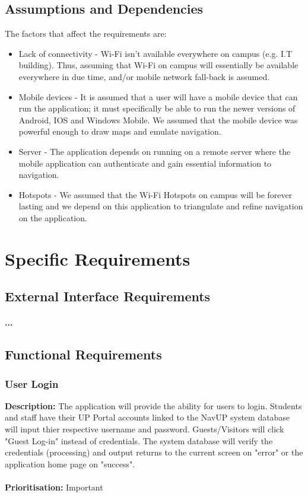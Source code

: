 \documentclass[runningheads,a4paper]{article}
\begin{document}
\subsection{Assumptions and Dependencies}
The factors that affect the requirements are:
\begin{itemize}
	 
		\item Lack of connectivity -  Wi-Fi isn't available everywhere on campus (e.g. I.T building). Thus, assuming that Wi-Fi on campus will essentially be available everywhere in due time, and/or mobile network fall-back is assumed.
		
		\item Mobile devices - It is assumed that a user will have a mobile device that can run the application; it must specifically be able to run the newer versions of Android, IOS and Windows Mobile. We assumed that the mobile device was powerful enough to draw maps and emulate navigation.
		\item Server - The application depends on running on a remote server where the mobile application can authenticate and gain essential information to navigation.
		
		\item Hotspots - We assumed that the Wi-Fi Hotspots on campus will be forever lasting and we depend on this application to triangulate and refine navigation on the application.
	 
\end{itemize}


\section{Specific Requirements}

\subsection{External Interface Requirements}
\paragraph{...}
\subsection{Functional Requirements}

\subsubsection{User Login}
\textbf{Description:}  The application will provide the ability for users to login. Students and staff have their UP Portal accounts linked to the NavUP system database will input thier respective username and password. Guests/Visitors will click "Guest Log-in" instead of credentials. The system database will verify the credentials (processing) and output returns to the current screen on "error" or the application home page on "success".\\\\
\noindent
\textbf{Prioritisation:} Important\\
  
\end{document}
